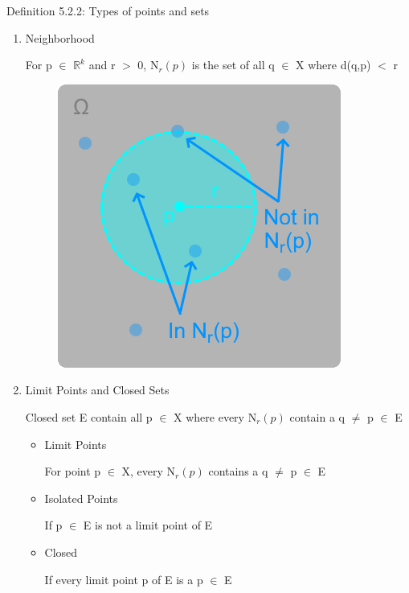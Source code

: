 { \color{blue} Definition 5.2.2: Types of points and sets } 
	\begin{enumerate}[label=(\alph*), leftmargin=2cm, itemsep=0.4em]
		\item {\color{lblue} Neighborhood}

			\qquad For p $\in$ $\mathbb{R}^k$ and r $>$ 0, N$_r(p)$ is the set of all q $\in$ X
			where d(q,p) $<$ r

			\begin{figure}[h]
				\centering
				\includegraphics[scale=0.45]{Images/5.2.2a.png}
			\end{figure}

		\item {\color{lblue} Limit Points and Closed Sets}

			\hspace{0.1cm} Closed set E contain all p $\in$ X where every N$_r(p)$ contain
			a q $\neq$ p $\in$ E
			\begin{itemize}[leftmargin=1cm, itemsep=0.4em]
				\item Limit Points 

					\qquad For point p $\in$ X, every N$_r(p)$ contains a
					q $\neq$ p $\in$ E
				
				\item Isolated Points

					\qquad If p $\in$ E is not a limit point of E

				\item Closed

					\qquad If every limit point p of E is a p $\in$ E
			\end{itemize}


\end{enumerate}
